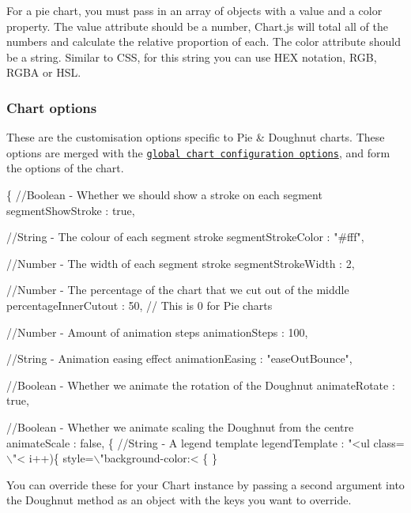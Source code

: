 For a pie chart, you must pass in an array of objects with a value and a color property. The value attribute should be a number, Chart.\+js will total all of the numbers and calculate the relative proportion of each. The color attribute should be a string. Similar to C\+SS, for this string you can use H\+EX notation, R\+GB, R\+G\+BA or H\+SL.

\subsubsection*{Chart options}

These are the customisation options specific to Pie \& Doughnut charts. These options are merged with the \href{#getting-started-global-chart-configuration}{\tt global chart configuration options}, and form the options of the chart.


\begin{DoxyCode}
\{
    //Boolean - Whether we should show a stroke on each segment
    segmentShowStroke : true,

    //String - The colour of each segment stroke
    segmentStrokeColor : "#fff",

    //Number - The width of each segment stroke
    segmentStrokeWidth : 2,

    //Number - The percentage of the chart that we cut out of the middle
    percentageInnerCutout : 50, // This is 0 for Pie charts

    //Number - Amount of animation steps
    animationSteps : 100,

    //String - Animation easing effect
    animationEasing : "easeOutBounce",

    //Boolean - Whether we animate the rotation of the Doughnut
    animateRotate : true,

    //Boolean - Whether we animate scaling the Doughnut from the centre
    animateScale : false,
    \{%
    //String - A legend template
    legendTemplate : "<ul class=\(\backslash\)"<%
       i++)\{%
       style=\(\backslash\)"background-color:<%
    \{%
\}
\end{DoxyCode}
 You can override these for your {\ttfamily Chart} instance by passing a second argument into the {\ttfamily Doughnut} method as an object with the keys you want to override.

